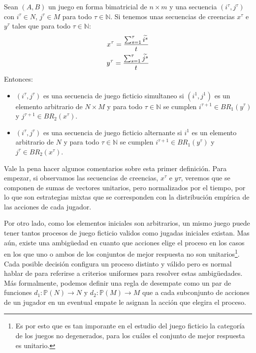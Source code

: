\begin{definition} \label{def:fp:berger}
    Sean $(A, B)$ un juego en forma bimatricial de $n \times m$ y una secuencia $(i^\tau, j^\tau)$ con $i^\tau \in N$, $j^\tau \in M$ para todo $\tau \in \mathbb{N}$. Si tenemos unas secuencias de creencias $x^\tau$ e $y^\tau$ tales que para todo $\tau \in \mathbb{N}$:
    \begin{gather*}
        x^\tau= \frac{\sum^\tau_{s=1} \widetilde{i^s}}{t}  \\
        y^\tau= \frac{\sum^\tau_{s=1} \widetilde{j^s}}{t}
    \end{gather*}
    Entonces:
    \begin{itemize}
        \item $(i^\tau, j^\tau)$ es una secuencia de juego ficticio simultaneo si $(i^1, j^1)$ es un elemento arbitrario de $N \times M$ y para todo $\tau \in \mathbb{N}$ se cumplen $i^{\tau+1} \in BR_1(y^\tau)$ y $j^{\tau+1} \in BR_2(x^\tau)$.
        \item $(i^\tau, j^\tau)$ es una secuencia de juego ficticio alternante si $i^1$ es un elemento arbitrario de $N$ y para todo $\tau \in \mathbb{N}$ se cumplen $i^{\tau+1} \in BR_1(y^\tau)$ y $j^{\tau} \in BR_2(x^\tau)$.
    \end{itemize}
\end{definition}

Vale la pena hacer algunos comentarios sobre esta primer definición. Para empezar, si observamos las secuencias de creencias, $x^\tau$ e $y\tau$, veremos que se componen de sumas de vectores unitarios, pero normalizados por el tiempo, por lo que son estrategias mixtas que se corresponden con la distribución empírica de las acciones de cada jugador.

Por otro lado, como los elementos iniciales son arbitrarios, un mismo juego puede tener tantos procesos de juego ficticio validos como jugadas iniciales existan. Mas aún, existe una ambigüedad en cuanto que acciones elige el proceso en los casos en los que uno o ambos de los conjuntos de mejor respuesta no son unitarios\footnote{Es por esto que es tan imporante en el estudio del juego ficticio la categoría de los juegos no degenerados, para los cuáles el conjunto de mejor respuesta es unitario.}. Cada posible decisión configura un proceso distinto y válido pero es normal hablar de  para referirse a criterios uniformes para resolver estas ambigüedades. Más formalmente, podemos definir una regla de desempate como un par de funciones $d_1: \mathbb{P}(N) \rightarrow N$ y $d_2: \mathbb{P}(M) \rightarrow M$ que a cada subconjunto de acciones de un jugador en un eventual empate le asignan la acción que elegira el proceso.

